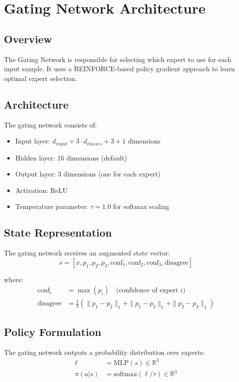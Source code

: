 \documentclass[11pt]{article}
\begin{document}
\section{Gating Network Architecture}

\subsection{Overview}
The Gating Network is responsible for selecting which expert to use for each input sample. It uses a REINFORCE-based policy gradient approach to learn optimal expert selection.

\subsection{Architecture}
The gating network consists of:
\begin{itemize}
    \item Input layer: $d_{input} + 3 \cdot d_{classes} + 3 + 1$ dimensions
    \item Hidden layer: 16 dimensions (default)
    \item Output layer: 3 dimensions (one for each expert)
    \item Activation: ReLU
    \item Temperature parameter: $\tau = 1.0$ for softmax scaling
\end{itemize}

\subsection{State Representation}
The gating network receives an augmented state vector:
\begin{equation}
    s = [x, p_1, p_2, p_3, \text{conf}_1, \text{conf}_2, \text{conf}_3, \text{disagree}]
\end{equation}

where:
\begin{align}
    \text{conf}_i &= \max(p_i) \quad \text{(confidence of expert } i\text{)} \\
    \text{disagree} &= \frac{1}{3} \left( \|p_1 - p_2\|_1 + \|p_1 - p_3\|_1 + \|p_2 - p_3\|_1 \right)
\end{align}

\subsection{Policy Formulation}
The gating network outputs a probability distribution over experts:
\begin{align}
    \ell &= \text{MLP}(s) \in \mathbb{R}^3 \\
    \pi(a|s) &= \text{softmax}(\ell/\tau) \in \mathbb{R}^3
\end{align}
\end{document}

